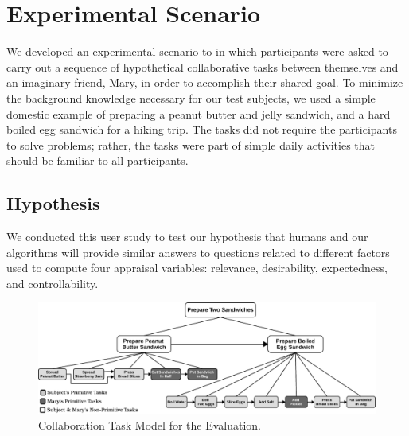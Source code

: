 \documentclass[12pt]{report}
\begin{document}
\section{Experimental Scenario}
We developed an experimental scenario to in which participants were asked to
carry out a sequence of hypothetical collaborative tasks between themselves and
an imaginary friend, Mary, in order to accomplish their shared goal. To minimize
the background knowledge necessary for our test subjects, we used a simple
domestic example of preparing a peanut butter and jelly sandwich, and a hard
boiled egg sandwich for a hiking trip. The tasks did not require the
participants to solve problems; rather, the tasks were part of simple daily
activities that should be familiar to all participants. 
% 
% 

\subsection{Hypothesis}
We conducted this user study to test our hypothesis that humans and our
algorithms will provide similar answers to questions related to different
factors used to compute four appraisal variables: relevance, desirability,
expectedness, and controllability.

\begin{figure}[tbh]
  \centering
  \includegraphics[width=1\textwidth]{figure/taskModel-croped.pdf}
  \caption{Collaboration Task Model for the Evaluation.}
  \label{fig:taskModel}
\end{figure}
\end{document}
